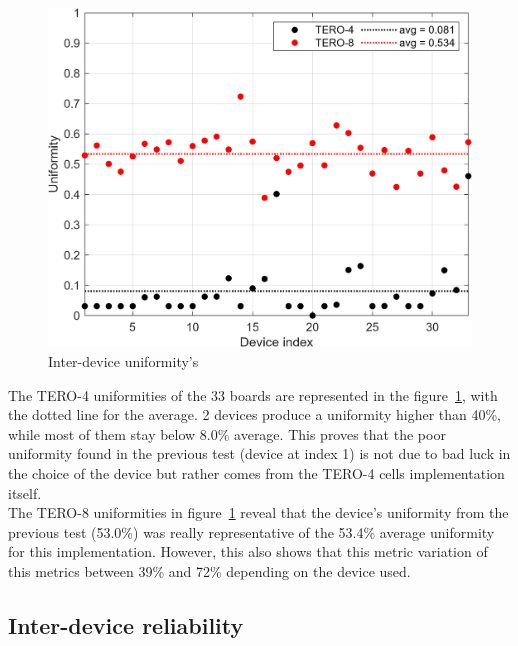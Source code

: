 \begin{figure}[H]
    \centering \includegraphics[width=0.8\linewidth]{images/tero_inter_uniformities.png}
    \caption{Inter-device uniformity's}
    \label{fig:tero_inter_uniformities}
\end{figure}


The TERO-4 uniformities of the 33 boards are represented in the figure~\ref{fig:tero_inter_uniformities}, with the dotted line for the average. 2 devices produce a uniformity higher than 40\%, while most of them stay below 8.0\% average. This proves that the poor uniformity found in the previous test (device at index 1) is not due to bad luck in the choice of the device but rather comes from the TERO-4 cells implementation itself.\\


The TERO-8 uniformities in figure~\ref{fig:tero_inter_uniformities} reveal that the device's uniformity from the previous test (53.0\%) was really representative of the 53.4\% average uniformity for this implementation. However, this also shows that this metric variation of this metrics between 39\% and 72\% depending on the device used.



\subsection{Inter-device reliability}
\label{subsec:inter_device_relia}

